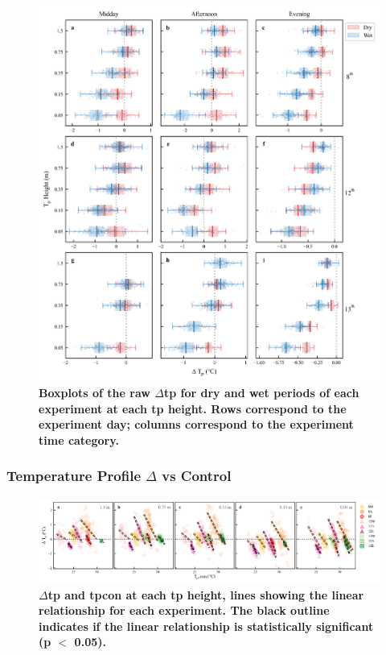 \documentclass[final,3p,times,authoryear]{elsarticle}
\begin{document}
\begin{figure}
\centering
\includegraphics[trim={0 0 0 0},clip,scale=1.0]{pict038.png}
\caption{\bf Boxplots of the raw $\Delta$\gls{tp} for dry and wet periods of each experiment at each \gls{tp} height. Rows correspond to the experiment day; columns correspond to the experiment time category.}
 \label{fig:7.9}
\end{figure}
\clearpage

\subsubsection{Temperature Profile $\Delta$ vs Control}\label{sec:appendix7.5.2}

\begin{figure}
\centering
\includegraphics[trim={0 0 0 0},clip,scale=1.0]{pict039.png}
\caption{\bf $\Delta$\gls{tp} and \gls{tpcon} at each \gls{tp} height, lines showing the linear relationship for each experiment. The black outline indicates if the linear relationship is statistically significant (\gls{p} $<$ 0.05).}
 \label{fig:7.10}
\end{figure}
\clearpage
\end{document}
